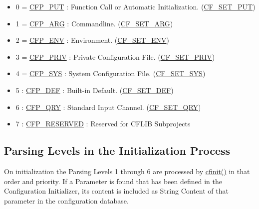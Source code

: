 \begin{itemize}
\item 0 = \hyperlink{group__cflib__core_g764a8ea81ffc3940bf413797dcaf9a3d}{CFP\_\-PUT} : Function Call or Automatic Initialization.  (\hyperlink{group__special__options__mask_g8d6cd1608fef5638efe964da63edf2dd}{CF\_\-SET\_\-PUT})\item 1 = \hyperlink{group__cflib__core_g0901da5871f3cffeec56e491f8c9fc7f}{CFP\_\-ARG} : Commandline.  (\hyperlink{group__special__options__mask_g1b3eb474a5160e5a32385f6de53d90d6}{CF\_\-SET\_\-ARG})\item 2 = \hyperlink{group__cflib__core_gc77d72299f32e91104090cdeb93f3619}{CFP\_\-ENV} : Environment.  (\hyperlink{group__special__options__mask_g29dbd098a75a23ddc42b3b53e430d694}{CF\_\-SET\_\-ENV})\item 3 = \hyperlink{group__cflib__core_g6cf8dcc9fa01deae5eb44698cb01f73e}{CFP\_\-PRIV} : Private Configuration File.  (\hyperlink{group__special__options__mask_gabf1d4d312964af93bd55f71eeec6988}{CF\_\-SET\_\-PRIV})\item 4 = \hyperlink{group__cflib__core_g0365a86453eeaa815a79c506343bd927}{CFP\_\-SYS} : System Configuration File.  (\hyperlink{group__special__options__mask_g8fe09807491ee119290329cf08e6f340}{CF\_\-SET\_\-SYS})\item 5 : \hyperlink{group__cflib__core_gfa9b2b859f08e9b319cc50555255a975}{CFP\_\-DEF} : Built-in Default.  (\hyperlink{group__special__options__mask_g17b4ef5b35afe21a4a80faa671030b65}{CF\_\-SET\_\-DEF})\item 6 : \hyperlink{group__cflib__core_g91ce348a0630961b0c472e7dec732aae}{CFP\_\-QRY} : Standard Input Channel.  (\hyperlink{group__special__options__mask_g09dcbb96c5ace43a7d5e7e4f52d387a8}{CF\_\-SET\_\-QRY})\item 7 : \hyperlink{group__cflib__core_g631bc61e35c14f1d3df36a71154a776a}{CFP\_\-RESERVED} : Reserved for CFLIB Subprojects\end{itemize}
\hypertarget{config_levels_initialization_process}{}\subsection{Parsing Levels in the Initialization Process}\label{config_levels_initialization_process}
On initialization the Parsing Levels 1 through 6 are processed by \hyperlink{group__cflib__core_ge593ff607f853bd5fc16a16bb6759314}{cfinit()} in that order and priority. If a Parameter is found that has been defined in the Configuration Initializer, its content is included as String Content of that parameter in the configuration database.


